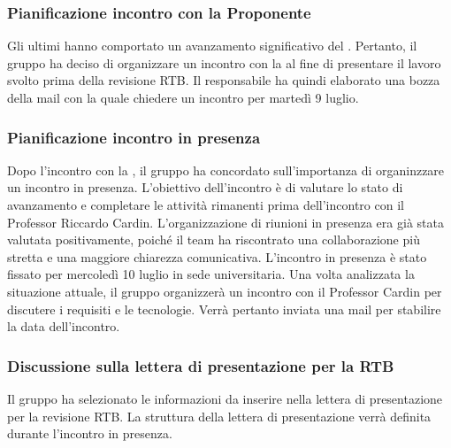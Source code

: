 \subsubsection{Pianificazione incontro con la Proponente}
\par Gli ultimi  hanno comportato un avanzamento significativo del . 
Pertanto, il gruppo ha deciso di organizzare un incontro con la  al fine di presentare il lavoro svolto prima della revisione RTB. 
Il responsabile ha quindi elaborato una bozza della mail con la quale chiedere un incontro per martedì 9 luglio.

\subsubsection{Pianificazione incontro in presenza}
\par Dopo l'incontro con la , il gruppo ha concordato sull'importanza di organinzzare un incontro in presenza. L'obiettivo dell'incontro è di valutare lo stato di avanzamento e completare le attività rimanenti prima dell'incontro con il Professor Riccardo Cardin. L'organizzazione di riunioni in presenza era già stata valutata positivamente, poiché il team ha riscontrato una collaborazione più stretta e una maggiore chiarezza comunicativa.  
L'incontro in presenza è stato fissato per mercoledì 10 luglio in sede universitaria. Una volta analizzata la situazione attuale, il gruppo organizzerà un incontro con il Professor Cardin per discutere i requisiti e le tecnologie. Verrà pertanto inviata una mail per stabilire la data dell'incontro.

\subsubsection{Discussione sulla lettera di presentazione per la RTB}
\par Il gruppo ha selezionato le informazioni da inserire nella lettera di presentazione per la revisione RTB. La struttura della lettera di presentazione verrà definita durante l'incontro in presenza.
